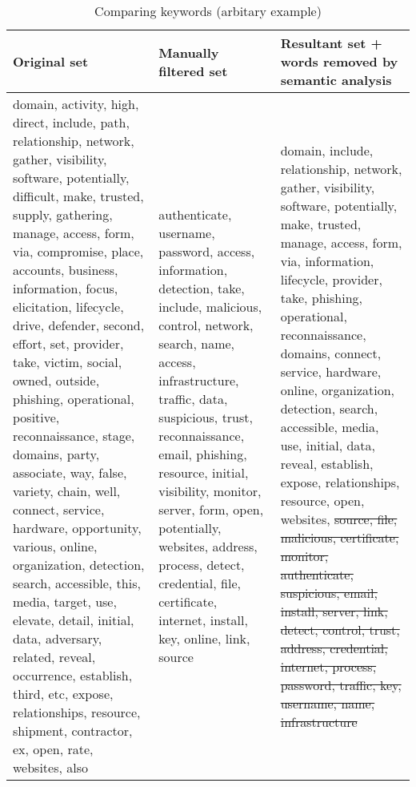 \begin{table}[h]
    \caption{Comparing keywords (arbitary example)}
    \label{crouch}
    \begin{tabularx}{\textwidth}{p{}XX}
        \toprule
        \textbf{Original set} & \textbf{Manually filtered set} & \textbf{Resultant set + words removed by semantic analysis} \\
        \midrule
        domain, activity, high, direct, include, path, relationship, network, gather, visibility, software, potentially, difficult, make, trusted, supply, gathering, manage, access, form, via, compromise, place, accounts, business, information, focus, elicitation, lifecycle, drive, defender, second, effort, set, provider, take, victim, social, owned, outside, phishing, operational, positive, reconnaissance, stage, domains, party, associate, way, false, variety, chain, well, connect, service, hardware, opportunity, various, online, organization, detection, search, accessible, this, media, target, use, elevate, detail, initial, data, adversary, related, reveal, occurrence, establish, third, etc, expose, relationships, resource, shipment, contractor, ex, open, rate, websites, also
        &
        authenticate, username, password, access, information, detection, take, include, malicious, control, network, search, name, access, infrastructure, traffic, data, suspicious, trust, reconnaissance, email, phishing, resource, initial, visibility, monitor, server, form, open, potentially, websites, address, process, detect, credential, file, certificate, internet, install, key, online, link, source
        &
        domain, include, relationship, network, gather, visibility, software, potentially, make, trusted, manage, access, form, via, information, lifecycle, provider, take, phishing, operational, reconnaissance, domains, connect, service, hardware, online, organization, detection, search, accessible, media, use, initial, data, reveal, establish, expose, relationships, resource, open, websites, \sout{source, file, malicious, certificate, monitor, authenticate, suspicious, email, install, server, link, detect, control, trust, address, credential, internet, process, password, traffic, key, username, name, infrastructure} \\
        \bottomrule
    \end{tabularx}
\end{table}
\clearpage

